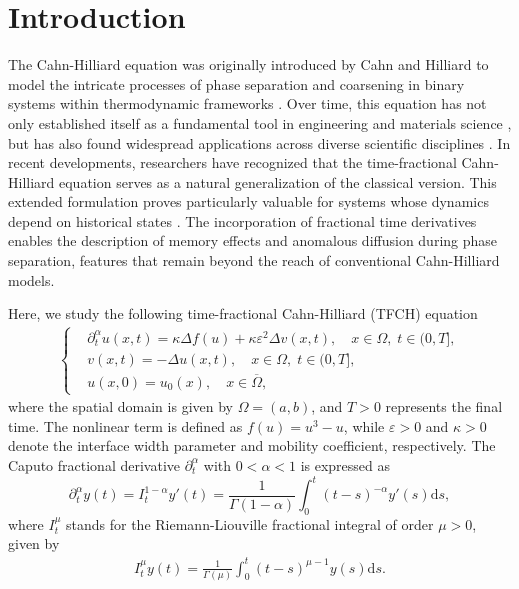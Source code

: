 \documentclass{siamart171218}
\theoremstyle{remark}
\theoremstyle{example}
\numberwithin{equation}{section}
\begin{document}
\section{Introduction}\label{sec: introduction}

The Cahn-Hilliard equation was originally introduced by Cahn and Hilliard to model the intricate processes of phase separation and coarsening in binary systems within thermodynamic frameworks \cite{Cahn}. Over time, this equation has not only established itself as a fundamental tool in engineering and materials science \cite{Bourdin, Chen, Du2004, Du2005}, but has also found widespread applications across diverse scientific disciplines \cite{Bertozzi2006, Bertozzi2007, Shen1, Shen2}. In recent developments, researchers have recognized that the time-fractional Cahn-Hilliard equation serves as a natural generalization of the classical version. This extended formulation proves particularly valuable for systems whose dynamics depend on historical states \cite{Sadaf, Zhao2019, Fritz}. The incorporation of fractional time derivatives enables the description of memory effects and anomalous diffusion during phase separation, features that remain beyond the reach of conventional Cahn-Hilliard models.

Here, we study the following time-fractional Cahn-Hilliard (TFCH) equation
\begin{align}\label{eq.1.1}
\left\{
\begin{aligned}
  &\partial^\alpha_t u(x,t) = \kappa \Delta f(u)+\kappa \varepsilon^2 \Delta v(x,t),  \quad x\in\Omega,\; t\in(0,T], \\
  & v(x,t)=-\Delta u(x,t),  \quad x\in\Omega,\; t\in(0,T], \\
 &u(x,0) =u_0 (x), \quad x\in\overline{\Omega},
\end{aligned}
\right.
\end{align}
where the spatial domain is given by $\Omega = (a,b)$, and $T > 0$ represents the final time. The nonlinear term is defined as $f(u) = u^3 - u$, while $\varepsilon > 0$ and $\kappa > 0$ denote the interface width parameter and mobility coefficient, respectively. The Caputo fractional derivative $\partial^\alpha_t$ with $0 < \alpha < 1$ is expressed as
\begin{equation}\label{eq.1.2}
\partial^\alpha_t y(t) = I_t^{1-\alpha }y' (t) = \frac{1}{\Gamma(1-\alpha)}\int_0^t (t-s)^{-\alpha} y'(s) \mathrm{d}s,
\end{equation}
where $I_t^\mu$ stands for the Riemann-Liouville fractional integral of order $\mu > 0$, given by
\begin{align*}
I_t^\mu y (t) = \frac{1}{\Gamma(\mu)}\int_0^t (t-s)^{\mu-1} y(s) \mathrm{d}s.
\end{align*}
\end{document}
